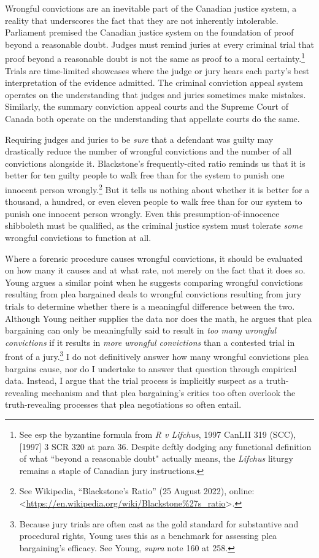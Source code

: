 Wrongful convictions are an inevitable part of the Canadian justice system, a reality that underscores the fact that they are not inherently intolerable. Parliament premised the Canadian justice system on the foundation of proof beyond a reasonable doubt. Judges must remind juries at every criminal trial that proof beyond a reasonable doubt is not the same as proof to a moral certainty.\footnote{See esp the byzantine formula from \textit{R v Lifchus}, 1997 CanLII 319 (SCC), [1997] 3 SCR 320 at para 36. Despite deftly dodging any functional definition of what ``beyond a reasonable doubt" actually means, the \textit{Lifchus} liturgy remains a staple of Canadian jury instructions.} Trials are time-limited showcases where the judge or jury hears each party's best interpretation of the evidence admitted. The criminal conviction appeal system operates on the understanding that judges and juries sometimes make mistakes. Similarly, the summary conviction appeal courts and the Supreme Court of Canada both operate on the understanding that appellate courts do the same. 

Requiring judges and juries to be \textit{sure} that a defendant was guilty may drastically reduce the number of wrongful convictions and the number of all convictions alongside it. Blackstone's frequently-cited ratio reminds us that it is better for ten guilty people to walk free than for the system to punish one innocent person wrongly.\footnote{See Wikipedia, “Blackstone's Ratio” (25 August 2022), online:\textless \url{https://en.wikipedia.org/wiki/Blackstone\%27s_ratio}\textgreater.} But it tells us nothing about whether it is better for a thousand, a hundred, or even eleven people to walk free than for our system to punish one innocent person wrongly. Even this presumption-of-innocence shibboleth must be qualified, as the criminal justice system must tolerate \textit{some} wrongful convictions to function at all. 

Where a forensic procedure causes wrongful convictions, it should be evaluated on how many it causes and at what rate, not merely on the fact that it does so. Young argues a similar point when he suggests comparing wrongful convictions resulting from plea bargained deals to wrongful convictions resulting from jury trials to determine whether there is a meaningful difference between the two. Although Young neither supplies the data nor does the math, he argues that plea bargaining can only be meaningfully said to result in \textit{too many wrongful convictions} if it results in \textit{more wrongful convictions} than a contested trial in front of a jury.\footnote{Because jury trials are often cast as the gold standard for substantive and procedural rights, Young uses this as a benchmark for assessing plea bargaining's efficacy. See Young, \textit{supra} note 160 at 258.} I do not definitively answer how many wrongful convictions plea bargains cause, nor do I undertake to answer that question through empirical data. Instead, I argue that the trial process is implicitly suspect as a truth-revealing mechanism and that plea bargaining's critics too often overlook the truth-revealing processes that plea negotiations so often entail. 

